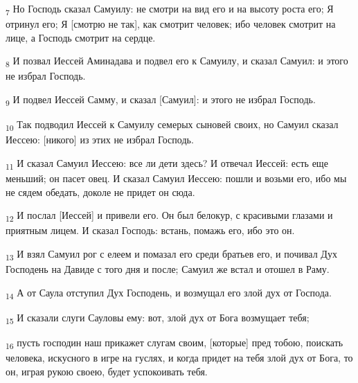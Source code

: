 \begin{tcolorbox}
\textsubscript{7} Но Господь сказал Самуилу: не смотри на вид его и на высоту роста его; Я отринул его; Я [смотрю не так], как смотрит человек; ибо человек смотрит на лице, а Господь смотрит на сердце.
\end{tcolorbox}
\begin{tcolorbox}
\textsubscript{8} И позвал Иессей Аминадава и подвел его к Самуилу, и сказал Самуил: и этого не избрал Господь.
\end{tcolorbox}
\begin{tcolorbox}
\textsubscript{9} И подвел Иессей Самму, и сказал [Самуил]: и этого не избрал Господь.
\end{tcolorbox}
\begin{tcolorbox}
\textsubscript{10} Так подводил Иессей к Самуилу семерых сыновей своих, но Самуил сказал Иессею: [никого] из этих не избрал Господь.
\end{tcolorbox}
\begin{tcolorbox}
\textsubscript{11} И сказал Самуил Иессею: все ли дети здесь? И отвечал Иессей: есть еще меньший; он пасет овец. И сказал Самуил Иессею: пошли и возьми его, ибо мы не сядем обедать, доколе не придет он сюда.
\end{tcolorbox}
\begin{tcolorbox}
\textsubscript{12} И послал [Иессей] и привели его. Он был белокур, с красивыми глазами и приятным лицем. И сказал Господь: встань, помажь его, ибо это он.
\end{tcolorbox}
\begin{tcolorbox}
\textsubscript{13} И взял Самуил рог с елеем и помазал его среди братьев его, и почивал Дух Господень на Давиде с того дня и после; Самуил же встал и отошел в Раму.
\end{tcolorbox}
\begin{tcolorbox}
\textsubscript{14} А от Саула отступил Дух Господень, и возмущал его злой дух от Господа.
\end{tcolorbox}
\begin{tcolorbox}
\textsubscript{15} И сказали слуги Сауловы ему: вот, злой дух от Бога возмущает тебя;
\end{tcolorbox}
\begin{tcolorbox}
\textsubscript{16} пусть господин наш прикажет слугам своим, [которые] пред тобою, поискать человека, искусного в игре на гуслях, и когда придет на тебя злой дух от Бога, то он, играя рукою своею, будет успокоивать тебя.
\end{tcolorbox}
